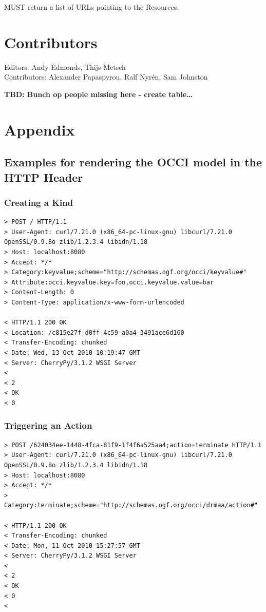 \documentclass[10pt,a4paper]{article}
\begin{document}
MUST return a list of URLs pointing to the Resources.

\section{Contributors}

Editors: Andy Edmonds, Thijs Metsch \\
Contributors: Alexander Papaspyrou, Ralf Nyrén, Sam Johnston

\textbf{TBD: Bunch op people missing here - create table\ldots}

\section{Appendix}

\subsection{Examples for rendering the OCCI model in the HTTP Header}

\subsubsection{Creating a Kind}
\begin{verbatim}
> POST / HTTP/1.1
> User-Agent: curl/7.21.0 (x86_64-pc-linux-gnu) libcurl/7.21.0 OpenSSL/0.9.8o zlib/1.2.3.4 libidn/1.18
> Host: localhost:8080
> Accept: */*
> Category:keyvalue;scheme="http://schemas.ogf.org/occi/keyvalue#"
> Attribute:occi.keyvalue.key=foo,occi.keyvalue.value=bar
> Content-Length: 0
> Content-Type: application/x-www-form-urlencoded

< HTTP/1.1 200 OK
< Location: /c815e27f-d0ff-4c59-a0a4-3491ace6d160
< Transfer-Encoding: chunked
< Date: Wed, 13 Oct 2010 10:19:47 GMT
< Server: CherryPy/3.1.2 WSGI Server
< 
< 2
< OK
< 0
\end{verbatim}

\subsubsection{Triggering an Action}

\begin{verbatim}
> POST /624034ee-1448-4fca-81f9-1f4f6a525aa4;action=terminate HTTP/1.1
> User-Agent: curl/7.21.0 (x86_64-pc-linux-gnu) libcurl/7.21.0 OpenSSL/0.9.8o zlib/1.2.3.4 libidn/1.18
> Host: localhost:8080
> Accept: */*
> Category:terminate;scheme="http://schemas.ogf.org/occi/drmaa/action#"

< HTTP/1.1 200 OK
< Transfer-Encoding: chunked
< Date: Mon, 11 Oct 2010 15:27:57 GMT
< Server: CherryPy/3.1.2 WSGI Server
< 
< 2
< OK
< 0
<
\end{verbatim}
\end{document}

